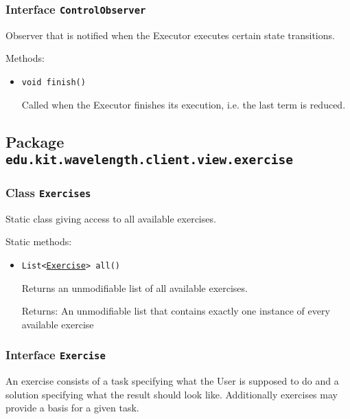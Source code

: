 \subsubsection{Interface \texttt{ControlObserver}}
\label{type:edu.kit.wavelength.client.view.execution.ControlObserver}
Observer that is notified when the Executor executes certain state transitions.

Methods:
\begin{itemize}
\item \texttt{void finish()}

Called when the Executor finishes its execution, i.e. the last term is reduced.

\end{itemize}

\subsection{Package \lstinline{edu.kit.wavelength.client.view.exercise}}
\label{pkg:edu.kit.wavelength.client.view.exercise}


\subsubsection{Class \texttt{Exercises}}
\label{type:edu.kit.wavelength.client.view.exercise.Exercises}
Static class giving access to all available exercises.

Static methods:
\begin{itemize}
\item \texttt{List<\hyperref[type:edu.kit.wavelength.client.view.exercise.Exercise]{Exercise}> all()}

Returns an unmodifiable list of all available exercises.

Returns: An unmodifiable list that contains exactly one instance of every
         available exercise

\end{itemize}

\subsubsection{Interface \texttt{Exercise}}
\label{type:edu.kit.wavelength.client.view.exercise.Exercise}
An exercise consists of a task specifying what the User is supposed to do and
 a solution specifying what the result should look like. Additionally
 exercises may provide a basis for a given task.

